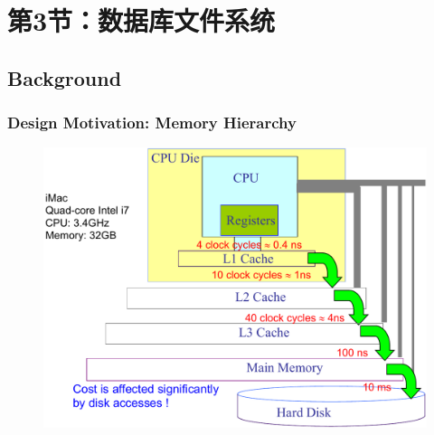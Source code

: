 \section{第3节：数据库文件系统} %
\subsection{Background} %

\begin{frame}[fragile]
    \frametitle{Design Motivation: Memory Hierarchy}
    \begin{figure}
        \includegraphics[width=0.6\linewidth]{figs/dbfile-mem-hierarchy.pdf}
    \end{figure}
\end{frame}

